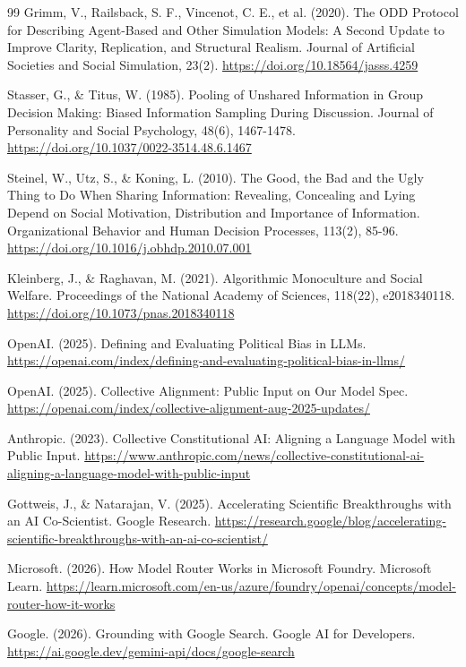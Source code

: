 \documentclass[11pt,a4paper]{article}
\begin{document}
\begin{thebibliography}{99}
Grimm, V., Railsback, S. F., Vincenot, C. E., et al. (2020). The ODD Protocol for Describing Agent-Based and Other Simulation Models: A Second Update to Improve Clarity, Replication, and Structural Realism. Journal of Artificial Societies and Social Simulation, 23(2). \url{https://doi.org/10.18564/jasss.4259}

Stasser, G., \& Titus, W. (1985). Pooling of Unshared Information in Group Decision Making: Biased Information Sampling During Discussion. Journal of Personality and Social Psychology, 48(6), 1467-1478. \url{https://doi.org/10.1037/0022-3514.48.6.1467}

Steinel, W., Utz, S., \& Koning, L. (2010). The Good, the Bad and the Ugly Thing to Do When Sharing Information: Revealing, Concealing and Lying Depend on Social Motivation, Distribution and Importance of Information. Organizational Behavior and Human Decision Processes, 113(2), 85-96. \url{https://doi.org/10.1016/j.obhdp.2010.07.001}

Kleinberg, J., \& Raghavan, M. (2021). Algorithmic Monoculture and Social Welfare. Proceedings of the National Academy of Sciences, 118(22), e2018340118. \url{https://doi.org/10.1073/pnas.2018340118}

OpenAI. (2025). Defining and Evaluating Political Bias in LLMs. \url{https://openai.com/index/defining-and-evaluating-political-bias-in-llms/}

OpenAI. (2025). Collective Alignment: Public Input on Our Model Spec. \url{https://openai.com/index/collective-alignment-aug-2025-updates/}

Anthropic. (2023). Collective Constitutional AI: Aligning a Language Model with Public Input. \url{https://www.anthropic.com/news/collective-constitutional-ai-aligning-a-language-model-with-public-input}

Gottweis, J., \& Natarajan, V. (2025). Accelerating Scientific Breakthroughs with an AI Co-Scientist. Google Research. \url{https://research.google/blog/accelerating-scientific-breakthroughs-with-an-ai-co-scientist/}

Microsoft. (2026). How Model Router Works in Microsoft Foundry. Microsoft Learn. \url{https://learn.microsoft.com/en-us/azure/foundry/openai/concepts/model-router-how-it-works}

Google. (2026). Grounding with Google Search. Google AI for Developers. \url{https://ai.google.dev/gemini-api/docs/google-search}


\end{thebibliography}
\end{document}

